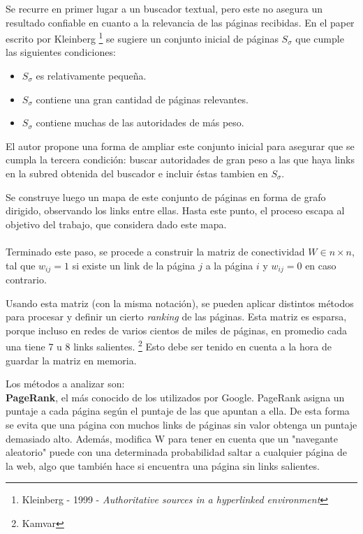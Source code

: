 \documentclass[a4paper]{article}
\begin{document}
Se recurre en primer lugar a un buscador textual, pero este no asegura un resultado confiable en cuanto a la relevancia de las páginas recibidas. En el paper escrito por Kleinberg \footnote{Kleinberg - 1999 - \textit{Authoritative sources in a hyperlinked environment}} se sugiere un conjunto inicial de páginas $S_{\sigma}$ que cumple las siguientes condiciones:

\begin{itemize}

\item $S_{\sigma}$ es relativamente pequeña.
\item $S_{\sigma}$ contiene una gran cantidad de p\'{a}ginas relevantes.
\item $S_{\sigma}$ contiene muchas de las autoridades de m\'{a}s peso.

\end{itemize}

El autor propone una forma de ampliar este conjunto inicial para asegurar que se cumpla la tercera condición: buscar autoridades de gran peso a las que haya links en la subred obtenida del buscador e incluir \'{e}stas tambien en $S_{\sigma}$. 

Se construye luego un mapa de este conjunto de páginas en forma de grafo dirigido, observando los links entre ellas. Hasta este punto, el proceso escapa al objetivo del trabajo, que considera dado este mapa.\\ \\

Terminado este paso, se procede a construir la matriz de conectividad $W \in n \times n$, tal que $w_{ij}=1$ si existe un link de la página $j$ a la página $i$ y $w_{ij}=0$ en caso contrario. 

Usando esta matriz (con la misma notación), se pueden aplicar distintos m\'{e}todos para procesar y definir un cierto \textit{ranking} de las p\'{a}ginas.
Esta matriz es esparsa, porque incluso en redes de varios cientos de miles de páginas, en promedio cada una tiene 7 u 8 links salientes. \footnote{Kamvar}
Esto debe ser tenido en cuenta a la hora de guardar la matriz en memoria.

Los métodos a analizar son: \\


\textbf{PageRank}, el más conocido de los utilizados por Google. PageRank asigna un puntaje a cada página según el puntaje de las que apuntan a ella. De esta forma se evita que una página con muchos links de páginas sin valor obtenga un puntaje demasiado alto. Además, modifica W para tener en cuenta que un "navegante aleatorio" puede con una determinada probabilidad saltar a cualquier página de la web, algo que también hace si encuentra una página sin links salientes.
\end{document}
